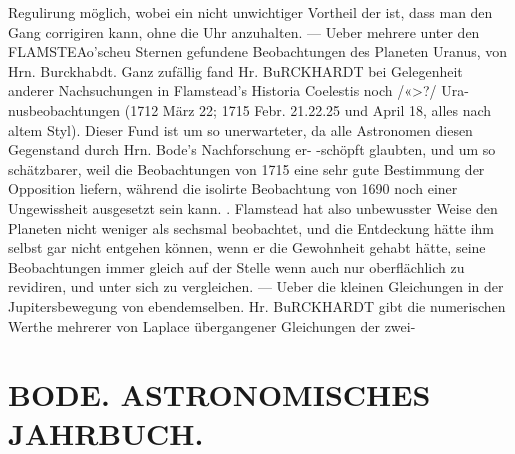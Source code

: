 \documentclass[12pt,a4paper]{article}
\begin{document}
{{{{{{{{Regulirung  möglich,  wobei  ein  nicht  unwichtiger  Vortheil  der  ist,  dass  man den  Gang  corrigiren  kann,  ohne  die  Uhr  anzuhalten.  ---  Ueber  mehrere  unter  den  FLAMSTEAo'scheu Sternen  gefundene  Beobachtungen  des  Planeten  Uranus,  von  Hrn.  Burckhabdt.  Ganz  zufällig  fand  Hr. BuRCKHARDT  bei  Gelegenheit  anderer  Nachsuchungen  in  Flamstead's  Historia  Coelestis  noch  /«>?/  Ura- nusbeobachtungen (1712  März  22;  1715  Febr.  21.22.25  und  April  18,  alles  nach  altem  Styl).  Dieser  Fund ist  um  so  unerwarteter,  da  alle  Astronomen  diesen  Gegenstand  durch  Hrn.  Bode's  Nachforschung  er- -schöpft  glaubten,  und  um  so  schätzbarer,  weil  die  Beobachtungen  von  1715  eine  sehr  gute  Bestimmung der  Opposition  liefern,  während  die  isolirte  Beobachtung  von  1690  noch  einer  Ungewissheit  ausgesetzt sein  kann. .  Flamstead  hat  also  unbewusster  Weise  den  Planeten  nicht  weniger  als  sechsmal  beobachtet, und  die  Entdeckung  hätte  ihm  selbst  gar  nicht  entgehen  können,  wenn  er  die  Gewohnheit  gehabt  hätte, seine  Beobachtungen  immer  gleich  auf  der  Stelle  wenn  auch  nur  oberflächlich  zu  revidiren,  und  unter sich  zu  vergleichen.  ---  Ueber  die  kleinen  Gleichungen  in  der  Jupitersbewegung  von  ebendemselben. Hr.  BuRCKHARDT  gibt  die  numerischen  Werthe  mehrerer  von  Laplace  übergangener  Gleichungen  der  zwei-


\section*{BODE.     ASTRONOMISCHES  JAHRBUCH.}

}}}}}}}}
\end{document}
